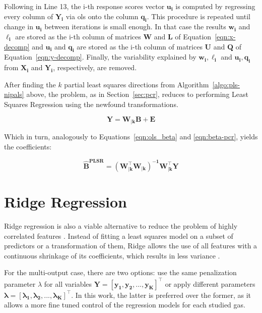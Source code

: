 Following in Line 13, the i-th response scores vector $\mathbf{u_i}$ is computed by regressing every column of $\mathbf{Y_i}$ via \acrshort{ols} onto the column $\mathbf{q_i}$. This procedure is repeated until change in $\mathbf{u_i}$ between iterations is small enough. In that case the results $\mathbf{w_i}$ and $\mathbf{\ell_i}$ are stored as the i-th column of matrices $\mathbf{W}$ and $\mathbf{L}$ of Equation~\ref{eqn:x-decomp} and $\mathbf{u_i}$ and $\mathbf{q_i}$ are stored as the i-th column of matrices $\mathbf{U}$ and $\mathbf{Q}$ of Equation~\ref{eqn:y-decomp}. Finally, the variability explained by $\mathbf{w_i, \ell_i}$ and $\mathbf{u_i, q_i}$ from $\mathbf{X_i}$ and $\mathbf{Y_i}$, respectively, are removed.

After finding the $k$ partial least squares directions from Algorithm~\ref{algo:pls-nipals} above, the problem, as in Section~\ref{sec:pcr}, reduces to performing Least Squares Regression using the newfound transformations.

	\begin{equation}
	\label{eqn:plsr}
	\mathbf{Y = W_{|k} B + E}
\end{equation}

Which in turn, analogously to Equations~\ref{eqn:ols_beta} and \ref{eqn:beta-pcr}, yields the coefficients:

\begin{equation}
	\label{eqn:beta-plsr}
	\mathbf{\hat{B}^{\text{PLSR}} = (W_{|k}^\intercal W_{|k})^{-1}W_{|k}^\intercal Y}
\end{equation}

\section{Ridge Regression}
\label{sec:ridge}

Ridge regression is also a viable alternative to reduce the problem of highly correlated features \parencite{friedman2001}. Instead of fitting a least squares model on a subset of predictors or a transformation of them, Ridge allows the use of all features with a continuous shrinkage of its coefficients, which results in less variance \parencite{friedman2001}.

For the multi-output case, there are two options: use the same penalization parameter $\lambda$ for all variables $\mathbf{Y = [y_1, y_2, ... , y_K]^\intercal}$ or apply different parameters $\mathbf{\boldsymbol{\lambda} = [\lambda_1, \lambda_2, ... , \lambda_K]^\intercal}$. In this work, the latter is preferred over the former, as it allows a more fine tuned control of the regression models for each studied gas.

